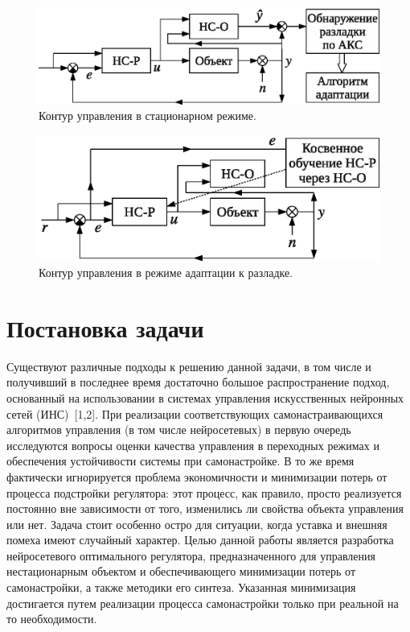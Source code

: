 \begin{figure}[h]
\centering
\includegraphics{steady_state_rus}
\caption{Контур управления в стационарном режиме.}
\label{fig:steady_state_loop}
\end{figure}

\begin{figure}[h]
\centering
\includegraphics{modified_adoption_rus}
\caption{Контур управления в режиме адаптации к разладке.}
\label{fig:permanent_adoption_loop}
\end{figure}

\section{Постановка задачи}

Существуют различные
подходы к решению данной задачи, в том числе и получивший в последнее
время достаточно большое распространение подход, основанный на
использовании в системах управления искусственных нейронных сетей
(ИНС) [1,2]. При реализации соответствующих самонастраивающихся
алгоритмов управления (в том числе нейросетевых) в первую очередь
исследуются вопросы оценки качества управления в переходных режимах и
обеспечения устойчивости системы при самонастройке. В то же время
фактически игнорируется проблема экономичности и минимизации потерь от
процесса подстройки регулятора: этот процесс, как правило, просто
реализуется постоянно вне зависимости от того, изменились ли свойства
объекта управления или нет. Задача стоит особенно остро для ситуации,
когда уставка и внешняя помеха имеют случайный характер.  Целью данной
работы является разработка нейросетевого оптимального регулятора,
предназначенного для управления нестационарным объектом и
обеспечивающего минимизации потерь от самонастройки, а также методики
его синтеза. Указанная минимизация достигается путем реализации
процесса самонастройки только при реальной на то необходимости.



